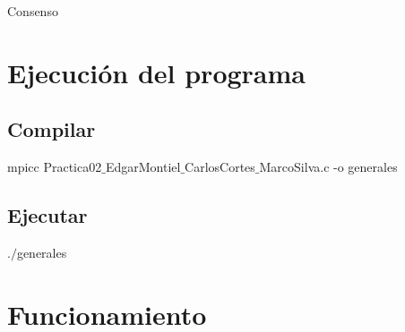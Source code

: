 \documentclass[a4paper,12pt]{article}
\begin{document}

\newpage

\newpage

\begin{center}
    {\huge Consenso}
\end{center}

\section*{Ejecución del programa}

\subsection*{Compilar}
\begin{center}    
    mpicc Practica02$\_$EdgarMontiel$\_$CarlosCortes$\_$MarcoSilva.c -o generales
\end{center}

\subsection*{Ejecutar}
\begin{center}
    $.\slash$generales
\end{center}

\section*{Funcionamiento}
\end{document}
